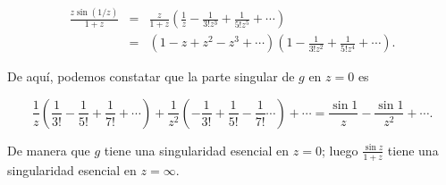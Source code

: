 \documentclass[12pt]{article}
\newenvironment{problem}[2][Problema]{\begin{trivlist}
\item[\hskip \labelsep {\bfseries #1}\hskip \labelsep {\bfseries #2.}]}{\end{trivlist}}
\begin{document}
\begin{eqnarray*}
\frac{z \sin(1/z)}{1 + z} &=& \frac{z}{1+z} \left(\frac{1}{z} - \frac{1}{3!z^3} + \frac{1}{5! z^5} + \cdots \right)\\
&=& (1 - z + z^2 - z^3 + \cdots) \left(1 - \frac{1}{3! z^2} + \frac{1}{5! z^4} + \cdots  \right).
\end{eqnarray*}

De aquí, podemos constatar que la parte singular de $g$ en $z=0$ es 

$$\frac{1}{z}\left(\frac{1}{3!} - \frac{1}{5!} + \frac{1}{7!} + \cdots \right) + \frac{1}{z^2} \left(-\frac{1}{3!} + \frac{1}{5!} - \frac{1}{7!} \cdots \right) +\cdots  = \frac{\sin 1}{z}  - \frac{\sin 1}{z^2} + \cdots.$$

De manera que $g$ tiene una singularidad esencial en $z=0$; luego $\frac{\sin z}{1+z}$ tiene una singularidad esencial en $z=\infty.$







\end{document}
